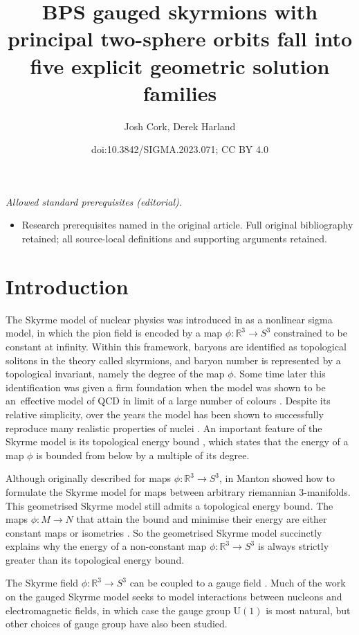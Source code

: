 \documentclass[10pt,a4paper]{amsart}
\title{BPS gauged skyrmions with principal two-sphere orbits fall into five explicit geometric solution families}
\author{Josh Cork, Derek Harland}
\date{doi:10.3842/SIGMA.2023.071; CC BY 4.0}
\newcommand{\U}{{\mathrm{U}}}
\newcommand{\R}{{\mathbb{R}}}
\newcommand{\1}{{\mathbb{1}}}
\numberwithin{equation}{section}
\begin{document}
\maketitle
\noindent\textit{Allowed standard prerequisites (editorial).}\begin{itemize}
\item Research prerequisites named in the original article. Full original bibliography retained; all source-local definitions and supporting arguments retained.
\end{itemize}\medskip
\section{Introduction}
The Skyrme model of nuclear physics was introduced in \cite{skyrme1962nucl} as a nonlinear sigma model, in which the pion field is encoded by a map $\phi\colon \R^3\to S^3$ constrained to be constant at infinity. Within this framework, baryons are identified as topological solitons in the theory called skyrmions, and baryon number is represented by a topological invariant, namely the degree of the map $\phi$. Some time later this identification was given a firm foundation when the model was shown to be an~effective model of QCD in limit of a large number of colours \cite{witten1979baryons}. Despite its relative simplicity, over the years the model has been shown to successfully reproduce many realistic properties of nuclei \cite{manton2022skyrmions:theory}. An important feature of the Skyrme model is its topological energy bound \cite{faddeev1976some}, which states that the energy of a map $\phi$ is bounded from below by a multiple of its degree.

Although originally described for maps $\phi\colon \R^3\to S^3$, in \cite{Manton1987geometry} Manton showed how to formulate the Skyrme model for maps between arbitrary riemannian $3$-manifolds. This geometrised Skyrme model still admits a topological energy bound. The maps $\phi\colon M\to N$ that attain the bound and minimise their energy are either constant maps or isometries \cite{Manton1987geometry}. So the geometrised Skyrme model succinctly explains why the energy of a non-constant map $\phi\colon \R^3\to S^3$ is always strictly greater than its topological energy bound.

The Skyrme field $\phi\colon \R^3\to S^3$ can be coupled to a gauge field \cite{ArthurTchrakian1996GaugedSky,
BrihayeHartmannTchhrakian2001MonopolesGaugeSky, CallanWitten1984monopole,cork2018skyrmions,
CorkHarlandWinyard2021gaugedskyrmelowbinding,
criadoKhozeSpannowsky2021emergence,dHokerFarhi1984decoupling,LivramentoRaduShnir2023solitons,navarroLRaduTchrakian2019topological,
PietteTchrakian2000static,RaduTchrakian2006spinning}. Much of the work on the gauged Skyrme model seeks to model interactions between nucleons and electromagnetic fields, in which case the gauge group $\U(1)$ is most natural, but other choices of gauge group have also been studied.
\end{document}
